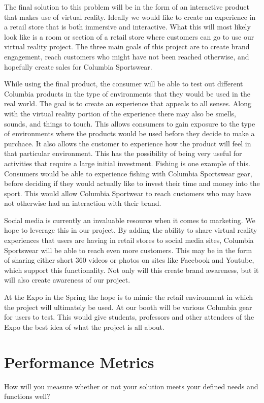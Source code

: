 \documentclass[letterpaper,10pt,titlepage]{article}
\begin{document}
The final solution to this problem will be in the form of an interactive
product that makes use of virtual reality. Ideally we would like to create an
experience in a retail store that is both immersive and interactive. What this
will most likely look like is a room or section of a retail store where
customers can go to use our virtual reality project. The three main goals of
this project are to create brand engagement, reach customers who might have not
been reached otherwise, and hopefully create sales for Columbia Sportswear.

While using the final product, the consumer will be able to test out different
Columbia products in the type of environments that they would be used in
the real world. The goal is to create an experience that appeals to all senses.
Along with the virtual reality portion of the experience there may also be
smells, sounds, and things to touch. This allows consumers to gain exposure to
the type of environments where the products would be used before they decide to
make a purchace. It also allows the customer to experience how the product will
feel in that particular environment. This has the possibility of being very
useful for activities that require a large initial investment. Fishing is one
example of this. Consumers would be able to experience fishing with Columbia
Sportswear gear, before deciding if they would actually like to invest their
time and money into the sport. This would allow Columbia Sportwear to reach
customers who may have not otherwise had an interaction with their brand.

Social media is currently an invaluable resource when it comes to marketing.
We hope to leverage this in our project. By adding the ability to share
virtual reality experiences that users are having in retail stores to social
media sites, Columbia Sportswear will be able to reach even more customers.
This may be in the form of sharing either short 360 videos or photos on sites
like Facebook and Youtube, which support this functionality. Not only will this
create brand awareness, but it will also create awareness of our project.

At the Expo in the Spring the hope is to mimic the retail environment in which
the project will ultimately be used. At our booth will be various Columbia gear
for users to test. This would give students, professors and other attendees of
the Expo the best idea of what the project is all about.

\section{Performance Metrics}
How will you measure whether or not your solution meets your defined needs and functions well?
\end{document}
